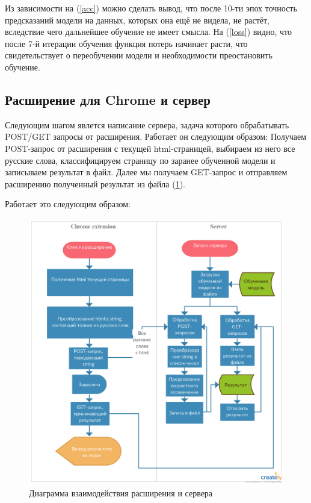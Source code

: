 \documentclass[14pt]{matmex-diploma}
\begin{document}
        Из зависимости на (\ref{acc}) можно сделать вывод, что после 10-ти эпох точность предсказаний модели на данных, которых
        она ещё не видела, не растёт, вследствие чего дальнейшее обучение не имеет смысла. На (\ref{loss}) видно, что после 7-й 
        итерации обучения функция потерь начинает расти, что свидетельствует о переобучении модели и необходимости 
        преостановить обучение.

    
    \subsection{Расширение для Chrome и сервер}
    
        Следующим шагом явлется написание сервера, задача которого обрабатывать POST/GET запросы от расширения. Работает он следующим образом:
        Получаем POST-запрос от расширения с текущей html-страницей, выбираем из него все русские слова, классифицируем страницу по заранее обученной
        модели и записываем результат в файл. Далее мы получаем GET-запрос и отправляем расширению полученный результат из файла (\ref{uml}).
    
        Работает это следующим образом:
        \begin{figure}[h]
            \centering
        	\includegraphics[scale=0.22]{images/uml.png}
        	\caption{Диаграмма взаимодействия расширения и сервера}
        	\label{uml}
        \end{figure}     
        
\end{document}
